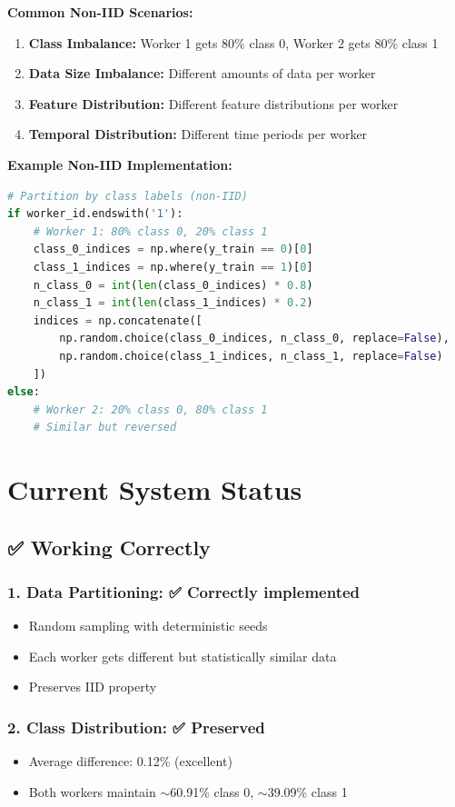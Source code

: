 \documentclass[12pt]{article}
\begin{document}
\textbf{Common Non-IID Scenarios:}
\begin{enumerate}
    \item \textbf{Class Imbalance:} Worker 1 gets 80\% class 0, Worker 2 gets 80\% class 1
    \item \textbf{Data Size Imbalance:} Different amounts of data per worker
    \item \textbf{Feature Distribution:} Different feature distributions per worker
    \item \textbf{Temporal Distribution:} Different time periods per worker
\end{enumerate}

\textbf{Example Non-IID Implementation:}
\begin{lstlisting}[language=Python]
# Partition by class labels (non-IID)
if worker_id.endswith('1'):
    # Worker 1: 80% class 0, 20% class 1
    class_0_indices = np.where(y_train == 0)[0]
    class_1_indices = np.where(y_train == 1)[0]
    n_class_0 = int(len(class_0_indices) * 0.8)
    n_class_1 = int(len(class_1_indices) * 0.2)
    indices = np.concatenate([
        np.random.choice(class_0_indices, n_class_0, replace=False),
        np.random.choice(class_1_indices, n_class_1, replace=False)
    ])
else:
    # Worker 2: 20% class 0, 80% class 1
    # Similar but reversed
\end{lstlisting}

\section{Current System Status}

\subsection{✅ Working Correctly}

\subsubsection{1. Data Partitioning: ✅ Correctly implemented}
\begin{itemize}
    \item Random sampling with deterministic seeds
    \item Each worker gets different but statistically similar data
    \item Preserves IID property
\end{itemize}

\subsubsection{2. Class Distribution: ✅ Preserved}
\begin{itemize}
    \item Average difference: 0.12\% (excellent)
    \item Both workers maintain $\sim$60.91\% class 0, $\sim$39.09\% class 1
\end{itemize}
\end{document}
